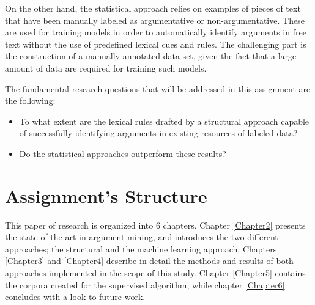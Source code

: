  On the other hand, the statistical approach relies on examples of pieces of text that have been manually labeled as argumentative or non-argumentative. These are used for training models in order to automatically identify arguments in free text without the use of predefined lexical cues and rules. The challenging part is the construction of a manually annotated data-set, given the fact that a large amount of data are required for training such models. \par
 
 The fundamental research questions that will be addressed in this assignment are the following:
 \begin{itemize}
   \item To what extent are the lexical rules drafted by a structural approach capable of successfully identifying arguments in existing resources of labeled data?
   \item Do the statistical approaches outperform these results?
 \end{itemize}  


\section{Assignment's Structure}

This paper of research is organized into 6 chapters. Chapter \ref{Chapter2} presents the state of the art in argument mining, and introduces the two different approaches; the structural and the machine learning approach. Chapters \ref{Chapter3} and \ref{Chapter4} describe in detail the methods and results of both approaches implemented in the scope of this study. Chapter \ref{Chapter5} contains the corpora created for the supervised algorithm, while chapter \ref{Chapter6} concludes with a look to future work. \par
